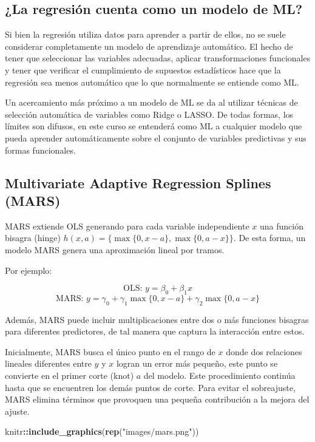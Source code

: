 \documentclass[
]{book}
\newenvironment{Shaded}{\begin{snugshade}}{\end{snugshade}}
\newcommand{\FunctionTok}[1]{\textcolor[rgb]{0.13,0.29,0.53}{\textbf{#1}}}
\newcommand{\NormalTok}[1]{#1}
\newcommand{\SpecialCharTok}[1]{\textcolor[rgb]{0.81,0.36,0.00}{\textbf{#1}}}
\newcommand{\StringTok}[1]{\textcolor[rgb]{0.31,0.60,0.02}{#1}}
\begin{document}
\subsection{¿La regresión cuenta como un modelo de ML?}\label{la-regresiuxf3n-cuenta-como-un-modelo-de-ml-1}

Si bien la regresión utiliza datos para aprender a partir de ellos, no
se suele considerar completamente un modelo de aprendizaje automático.
El hecho de tener que seleccionar las variables adecuadas, aplicar
transformaciones funcionales y tener que verificar el cumplimiento de
supuestos estadísticos hace que la regresión sea menos automático que lo
que normalmente se entiende como ML.

Un acercamiento más próximo a un modelo de ML se da al utilizar técnicas
de selección automática de variables como Ridge o LASSO. De todas
formas, los límites son difusos, en este curso se entenderá como ML a
cualquier modelo que pueda aprender automáticamente sobre el conjunto de
variables predictivas y sus formas funcionales.

\subsection{Multivariate Adaptive Regression Splines (MARS)}\label{multivariate-adaptive-regression-splines-mars-1}

MARS extiende OLS generando para cada variable independiente \(x\) una
función bisagra (hinge)
\(h(x, a) = \{ \max\{0, x-a\},  \max\{0, a-x\} \}\). De esta forma, un
modelo MARS genera una aproximación lineal por tramos.

Por ejemplo:

\[\text{OLS: }y = \beta_0 + \beta_1 x\]
\[\text{MARS: }y = \gamma_0 + \gamma_1 \max\{0, x-a\} + \gamma_2 \max\{0, a-x\}\]

Además, MARS puede incluir multiplicaciones entre dos o más funciones
bisagras para diferentes predictores, de tal manera que captura la
interacción entre estos.

Inicialmente, MARS busca el único punto en el rango de \(x\) donde dos
relaciones lineales diferentes entre \(y\) y \(x\) logran un error más
pequeño, este punto se convierte en el primer corte (knot) \(a\) del
modelo. Este procedimiento continúa hasta que se encuentren los demás
puntos de corte. Para evitar el sobreajuste, MARS elimina términos que
provoquen una pequeña contribución a la mejora del ajuste.

\begin{Shaded}
\begin{Highlighting}[]
\NormalTok{knitr}\SpecialCharTok{::}\FunctionTok{include\_graphics}\NormalTok{(}\FunctionTok{rep}\NormalTok{(}\StringTok{"images/mars.png"}\NormalTok{))}
\end{Highlighting}
\end{Shaded}
\end{document}
